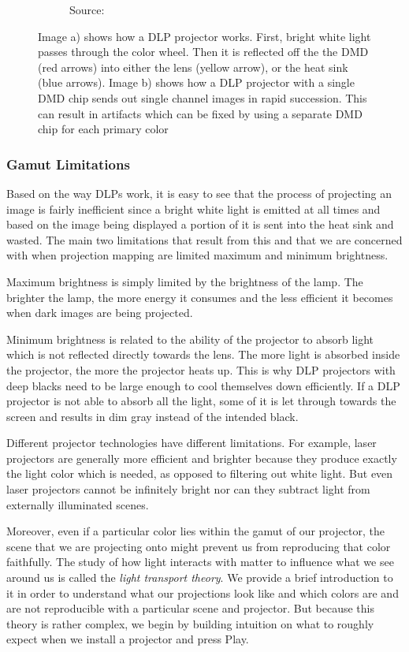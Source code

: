\begin{figure}[ht]
\begin{subfigure}[b]{0.49\textwidth}
        \caption{Source: \citet{ImageProjectorDLPRainbow}}
    \end{subfigure}
    \caption{Image a) shows how a DLP projector works. First, bright white light passes through the color wheel. Then it is reflected off the the DMD (red arrows) into either the lens (yellow arrow), or the heat sink (blue arrows). Image b) shows how a DLP projector with a single DMD chip sends out single channel images in rapid succession. This can result in artifacts which can be fixed by using a separate DMD chip for each primary color}
    \label{fig:background_projector_dlp}
\end{figure}

\subsubsection{Gamut Limitations}
\label{section:background-projection_mapping-projectors-limitations}

Based on the way DLPs work, it is easy to see that the process of projecting an image is fairly inefficient since a bright white light is emitted at all times and based on the image being displayed a portion of it is sent into the heat sink and wasted. The main two limitations that result from this and that we are concerned with when projection mapping are limited maximum and minimum brightness.

Maximum brightness is simply limited by the brightness of the lamp. The brighter the lamp, the more energy it consumes and the less efficient it becomes when dark images are being projected.

Minimum brightness is related to the ability of the projector to absorb light which is not reflected directly towards the lens. The more light is absorbed inside the projector, the more the projector heats up. This is why DLP projectors with deep blacks need to be large enough to cool themselves down efficiently. If a DLP projector is not able to absorb all the light, some of it is let through towards the screen and results in dim gray instead of the intended black.

Different projector technologies have different limitations. For example, laser projectors are generally more efficient and brighter because they produce exactly the light color which is needed, as opposed to filtering out white light. But even laser projectors cannot be infinitely bright nor can they subtract light from externally illuminated scenes.

Moreover, even if a particular color lies within the gamut of our projector, the scene that we are projecting onto might prevent us from reproducing that color faithfully. The study of how light interacts with matter to influence what we see around us is called the \textit{light transport theory}. We provide a brief introduction to it in order to understand what our projections look like and which colors are and are not reproducible with a particular scene and projector. But because this theory is rather complex, we begin by building intuition on what to roughly expect when we install a projector and press Play.

